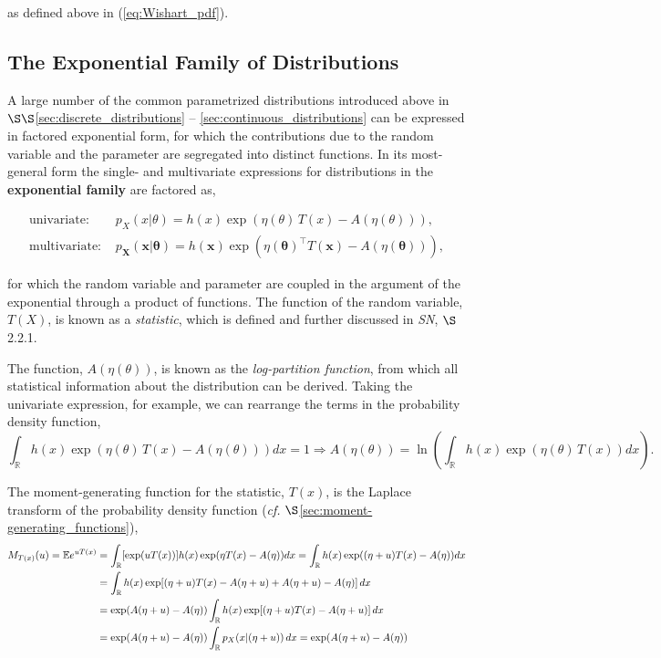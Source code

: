 \documentclass[12pt, twoside, draft]{article}
\begin{document}
as defined above in (\ref{eq:Wishart_pdf}).

\subsection{The Exponential Family of Distributions}\label{sec:exponential_family}
A large number of the common parametrized distributions introduced above in $\S\S$\ref{sec:discrete_distributions} -- \ref{sec:continuous_distributions} can be expressed in factored exponential form, for which the contributions due to the random variable and the parameter are segregated into distinct functions.  In its most-general form the single- and multivariate expressions for distributions in the \textbf{exponential family} are factored as,

\begin{align}
\text{univariate: } &p_X(x | \theta) = h(x) \exp(\eta(\theta) \, T(x) - A(\eta(\theta))), \\
\text{multivariate: } & p_\mathbf{X}(\mathbf{x} | \boldsymbol{\theta}) = h(\mathbf{x}) \exp(\eta(\boldsymbol{\theta})^\top T(\mathbf{x}) - A(\eta(\boldsymbol{\theta}))),
\end{align}

for which the random variable and parameter are coupled in the argument of the exponential through a product of functions.  The function of the random variable, $T(X)$, is known as a \textit{statistic}, which is defined and further discussed in \textit{SN}, $\S$2.2.1.

The function, $A(\eta(\theta))$, is known as the \textit{log-partition function}, from which all statistical information about the distribution can be derived.  Taking the univariate expression, for example, we can rearrange the terms in the probability density function,
\begin{equation}
\int_\mathbb{R}  h(x) \exp(\eta(\theta) \, T(x) - A(\eta(\theta))) dx = 1 \Rightarrow
A(\eta(\theta)) = \ln \left( \int_\mathbb{R}  h(x) \exp(\eta(\theta) \, T(x)) dx \right).
\end{equation}

The moment-generating function for the statistic, $T(x)$, is the Laplace transform of the probability density function (\textit{cf. }$\S$\ref{sec:moment-generating_functions}),
\begin{align}
M_{T(x)}(u) = \mathbb{E} e^{u T(x)} &= \int_\mathbb{R} [ \exp(u T(x)) ] h(x) \exp (\eta T(x) - A(\eta)) dx = \int_\mathbb{R} h(x) \exp((\eta + u)T(x) - A(\eta))dx \notag \\
&= \int_\mathbb{R} h(x)  \exp[(\eta + u)T(x) - A(\eta + u) + A(\eta + u) - A(\eta)] \, dx \notag \\
&= \exp(A(\eta + u) - A(\eta)) \int_\mathbb{R} h(x)  \exp[(\eta + u)T(x) - A(\eta + u)] \, dx \notag \\
&= \exp(A(\eta + u) - A(\eta)) \int_\mathbb{R} p_X(x | (\eta + u)) \, dx =  \exp(A(\eta + u) - A(\eta))
\end{align}
\end{document}
